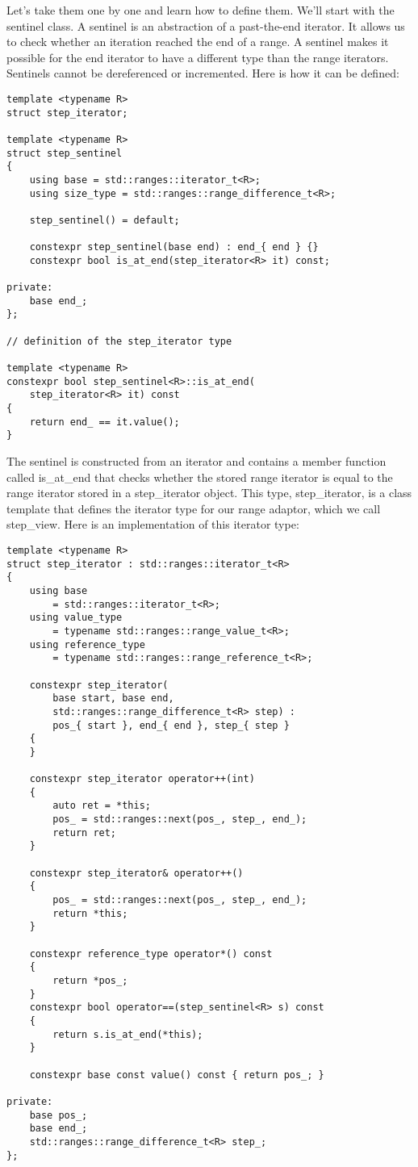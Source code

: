 Let’s take them one by one and learn how to define them. We’ll start with the sentinel class. A sentinel is an abstraction of a past-the-end iterator. It allows us to check whether an iteration reached the end of a range. A sentinel makes it possible for the end iterator to have a different type than the range iterators. Sentinels cannot be dereferenced or incremented. Here is how it can be defined:

\begin{lstlisting}[style=styleCXX]
template <typename R>
struct step_iterator;

template <typename R>
struct step_sentinel
{
	using base = std::ranges::iterator_t<R>;
	using size_type = std::ranges::range_difference_t<R>;
	
	step_sentinel() = default;
	
	constexpr step_sentinel(base end) : end_{ end } {}
	constexpr bool is_at_end(step_iterator<R> it) const;
	
private:
	base end_;
};

// definition of the step_iterator type

template <typename R>
constexpr bool step_sentinel<R>::is_at_end(
	step_iterator<R> it) const
{
	return end_ == it.value();
}
\end{lstlisting}

The sentinel is constructed from an iterator and contains a member function called is\_at\_end that checks whether the stored range iterator is equal to the range iterator stored in a step\_iterator object. This type, step\_iterator, is a class template that defines the iterator type for our range adaptor, which we call step\_view. Here is an implementation of this iterator type:

\begin{lstlisting}[style=styleCXX]
template <typename R>
struct step_iterator : std::ranges::iterator_t<R>
{
	using base
		= std::ranges::iterator_t<R>;
	using value_type
		= typename std::ranges::range_value_t<R>;
	using reference_type
		= typename std::ranges::range_reference_t<R>;
		
	constexpr step_iterator(
		base start, base end,
		std::ranges::range_difference_t<R> step) :
		pos_{ start }, end_{ end }, step_{ step }
	{
	}

	constexpr step_iterator operator++(int)
	{
		auto ret = *this;
		pos_ = std::ranges::next(pos_, step_, end_);
		return ret;
	}

	constexpr step_iterator& operator++()
	{
		pos_ = std::ranges::next(pos_, step_, end_);
		return *this;
	}

	constexpr reference_type operator*() const
	{
		return *pos_;
	}
	constexpr bool operator==(step_sentinel<R> s) const
	{
		return s.is_at_end(*this);
	}

	constexpr base const value() const { return pos_; }
	
private:
	base pos_;
	base end_;
	std::ranges::range_difference_t<R> step_;
};
\end{lstlisting}

